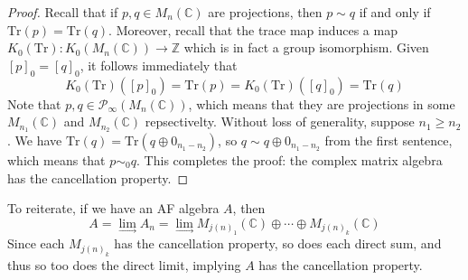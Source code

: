 \documentclass[aps,pra,showpacs,notitlepage,onecolumn,superscriptaddress,nofootinbib]{revtex4-1}
\theoremstyle{definition}
\begin{document}
\begin{proof}
  Recall that if $p, q \in M_n(\mathbb{C})$ are projections, then $p \sim q$ if and only if $\text{Tr}(p) = \text{Tr}(q)$. Moreover, recall that the trace map
  induces a map $K_0(\text{Tr}) : K_0(M_n(\mathbb{C})) \rightarrow \mathbb{Z}$ which is in fact a group isomorphism. Given $[p]_0 = [q]_0$, it follows immediately that
  $$K_0(\text{Tr})([p]_0) = \text{Tr}(p) = K_0(\text{Tr})([q]_0) = \text{Tr}(q)$$
  Note that $p, q \in \mathcal{P}_{\infty}(M_n(\mathbb{C}))$, which means that they are projections in some $M_{n_{1}}(\mathbb{C})$ and $M_{n_{2}}(\mathbb{C})$ repsectivelty. Without
  loss of generality, suppose $n_1 \geq n_2$. We have $\text{Tr}(q) = \text{Tr}(q \oplus 0_{n_{1} - n_{2}})$, so $q \sim q \oplus 0_{n_{1} - n_{2}}$ from the first sentence,
  which means that $p \sim_0 q$. This completes the proof: the complex matrix algebra has the cancellation property.
\end{proof}

\noindent To reiterate, if we have an AF algebra $A$, then
$$A = \lim_{\longrightarrow} A_n = \lim_{\longrightarrow} M_{j(n)_1}(\mathbb{C}) \oplus \cdots \oplus M_{j(n)_k}(\mathbb{C})$$
Since each $M_{j(n)_k}$ has the cancellation property, so does each direct sum, and thus so too does the direct limit, implying $A$ has the cancellation property.
\end{document}
